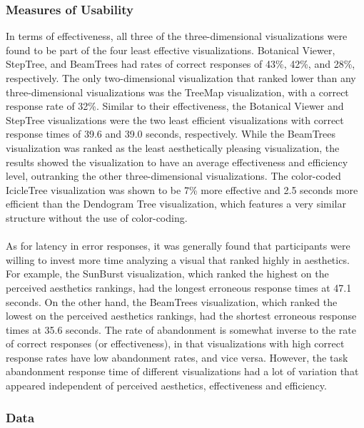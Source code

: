 \documentclass[twocolumn]{article}
\newcommand{\forceindent}{\leavevmode{\parindent=2em\indent}}
\begin{document}
		\subsubsection{Measures of Usability}
		\forceindent In terms of effectiveness, all three of the three-dimensional visualizations were found to be part of the four least effective visualizations. Botanical Viewer, StepTree, and BeamTrees had rates of correct responses of 43\%, 42\%, and 28\%, respectively. The only two-dimensional visualization that ranked lower than any three-dimensional visualizations was the TreeMap visualization, with a correct response rate of 32\%. Similar to their effectiveness, the Botanical Viewer and StepTree visualizations were the two least efficient visualizations with correct response times of 39.6 and 39.0 seconds, respectively. While the BeamTrees visualization was ranked as the least aesthetically pleasing visualization, the results showed the visualization to have an average effectiveness and efficiency level, outranking the other three-dimensional visualizations. The color-coded IcicleTree visualization was shown to be 7\% more effective and 2.5 seconds more efficient than the Dendogram Tree visualization, which features a very similar structure without the use of color-coding. \\ \\
		\forceindent As for latency in error responses, it was generally found that participants were willing to invest more time analyzing a visual that ranked highly in aesthetics. For example, the SunBurst visualization, which ranked the highest on the perceived aesthetics rankings, had the longest erroneous response times at 47.1 seconds. On the other hand, the BeamTrees visualization, which ranked the lowest on the perceived aesthetics rankings, had the shortest erroneous response times at 35.6 seconds. The rate of abandonment is somewhat inverse to the rate of correct responses (or effectiveness), in that visualizations with high correct response rates have low abandonment rates, and vice versa.  However, the task abandonment response time of different visualizations had a lot of variation that appeared independent of perceived aesthetics, effectiveness and efficiency.
		
		\subsubsection{Data}
		
\end{document}
